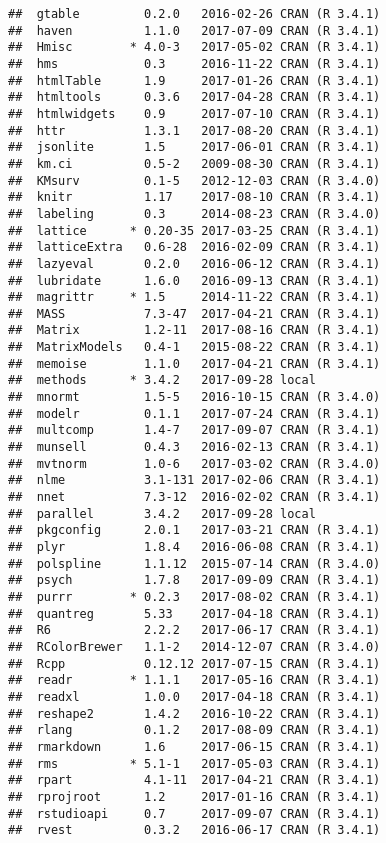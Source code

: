 \documentclass[]{book}
\theoremstyle{definition}
\theoremstyle{definition}
\theoremstyle{definition}
\theoremstyle{remark}
\begin{document}
\begin{verbatim}
##  gtable         0.2.0   2016-02-26 CRAN (R 3.4.1)
##  haven          1.1.0   2017-07-09 CRAN (R 3.4.1)
##  Hmisc        * 4.0-3   2017-05-02 CRAN (R 3.4.1)
##  hms            0.3     2016-11-22 CRAN (R 3.4.1)
##  htmlTable      1.9     2017-01-26 CRAN (R 3.4.1)
##  htmltools      0.3.6   2017-04-28 CRAN (R 3.4.1)
##  htmlwidgets    0.9     2017-07-10 CRAN (R 3.4.1)
##  httr           1.3.1   2017-08-20 CRAN (R 3.4.1)
##  jsonlite       1.5     2017-06-01 CRAN (R 3.4.1)
##  km.ci          0.5-2   2009-08-30 CRAN (R 3.4.1)
##  KMsurv         0.1-5   2012-12-03 CRAN (R 3.4.0)
##  knitr          1.17    2017-08-10 CRAN (R 3.4.1)
##  labeling       0.3     2014-08-23 CRAN (R 3.4.0)
##  lattice      * 0.20-35 2017-03-25 CRAN (R 3.4.1)
##  latticeExtra   0.6-28  2016-02-09 CRAN (R 3.4.1)
##  lazyeval       0.2.0   2016-06-12 CRAN (R 3.4.1)
##  lubridate      1.6.0   2016-09-13 CRAN (R 3.4.1)
##  magrittr     * 1.5     2014-11-22 CRAN (R 3.4.1)
##  MASS           7.3-47  2017-04-21 CRAN (R 3.4.1)
##  Matrix         1.2-11  2017-08-16 CRAN (R 3.4.1)
##  MatrixModels   0.4-1   2015-08-22 CRAN (R 3.4.1)
##  memoise        1.1.0   2017-04-21 CRAN (R 3.4.1)
##  methods      * 3.4.2   2017-09-28 local         
##  mnormt         1.5-5   2016-10-15 CRAN (R 3.4.0)
##  modelr         0.1.1   2017-07-24 CRAN (R 3.4.1)
##  multcomp       1.4-7   2017-09-07 CRAN (R 3.4.1)
##  munsell        0.4.3   2016-02-13 CRAN (R 3.4.1)
##  mvtnorm        1.0-6   2017-03-02 CRAN (R 3.4.0)
##  nlme           3.1-131 2017-02-06 CRAN (R 3.4.1)
##  nnet           7.3-12  2016-02-02 CRAN (R 3.4.1)
##  parallel       3.4.2   2017-09-28 local         
##  pkgconfig      2.0.1   2017-03-21 CRAN (R 3.4.1)
##  plyr           1.8.4   2016-06-08 CRAN (R 3.4.1)
##  polspline      1.1.12  2015-07-14 CRAN (R 3.4.0)
##  psych          1.7.8   2017-09-09 CRAN (R 3.4.1)
##  purrr        * 0.2.3   2017-08-02 CRAN (R 3.4.1)
##  quantreg       5.33    2017-04-18 CRAN (R 3.4.1)
##  R6             2.2.2   2017-06-17 CRAN (R 3.4.1)
##  RColorBrewer   1.1-2   2014-12-07 CRAN (R 3.4.0)
##  Rcpp           0.12.12 2017-07-15 CRAN (R 3.4.1)
##  readr        * 1.1.1   2017-05-16 CRAN (R 3.4.1)
##  readxl         1.0.0   2017-04-18 CRAN (R 3.4.1)
##  reshape2       1.4.2   2016-10-22 CRAN (R 3.4.1)
##  rlang          0.1.2   2017-08-09 CRAN (R 3.4.1)
##  rmarkdown      1.6     2017-06-15 CRAN (R 3.4.1)
##  rms          * 5.1-1   2017-05-03 CRAN (R 3.4.1)
##  rpart          4.1-11  2017-04-21 CRAN (R 3.4.1)
##  rprojroot      1.2     2017-01-16 CRAN (R 3.4.1)
##  rstudioapi     0.7     2017-09-07 CRAN (R 3.4.1)
##  rvest          0.3.2   2016-06-17 CRAN (R 3.4.1)

\end{verbatim}
\end{document}
